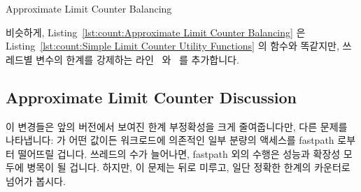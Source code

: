 \begin{listing}[tbp]

\caption{Approximate Limit Counter Balancing}
\label{lst:count:Approximate Limit Counter Balancing}
\end{listing}

\begin{fcvref}
비슷하게,
Listing~\ref{lst:count:Approximate Limit Counter Balancing}
은
Listing~\ref{lst:count:Simple Limit Counter Utility Functions}
의  함수와 똑같지만, 쓰레드별  변수의
 한계를 강제하는 라인~ 와~
를 추가합니다.
\end{fcvref}

\subsection{Approximate Limit Counter Discussion}

이 변경들은 앞의 버전에서 보여진 한계 부정확성을 크게 줄여줍니다만, 다른 문제를
나타냅니다:  가 어떤 값이든 워크로드에 의존적인 일부 분량의
액세스를 fastpath 로부터 떨어뜨릴 겁니다.
쓰레드의 수가 늘어나면, fastpath 외의 수행은 성능과 확장성 모두에 병목이 될
겁니다.
하지만, 이 문제는 뒤로 미루고, 일단 정확한 한계의 카운터로 넘어가 봅시다.


